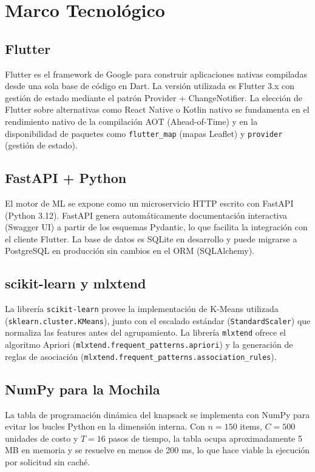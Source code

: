 \documentclass[12pt,letterpaper]{report}
\begin{document}
\section{Marco Tecnológico}

\subsection{Flutter}

Flutter es el framework de Google para construir aplicaciones nativas compiladas desde una
sola base de código en Dart. La versión utilizada es Flutter 3.x con gestión de estado
mediante el patrón Provider + ChangeNotifier. La elección de Flutter sobre alternativas
como React Native o Kotlin nativo se fundamenta en el rendimiento nativo de la compilación
AOT (Ahead-of-Time) y en la disponibilidad de paquetes como \texttt{flutter\_map}
(mapas Leaflet) y \texttt{provider} (gestión de estado).

\subsection{FastAPI + Python}

El motor de ML se expone como un microservicio HTTP escrito con FastAPI (Python 3.12).
FastAPI genera automáticamente documentación interactiva (Swagger UI) a partir de los
esquemas Pydantic, lo que facilita la integración con el cliente Flutter. La base de datos
es SQLite en desarrollo y puede migrarse a PostgreSQL en producción sin cambios en el ORM
(SQLAlchemy).

\subsection{scikit-learn y mlxtend}

La librería \texttt{scikit-learn} provee la implementación de K-Means utilizada
(\texttt{sklearn.cluster.KMeans}), junto con el escalado estándar
(\texttt{StandardScaler}) que normaliza las features antes del agrupamiento.
La librería \texttt{mlxtend} ofrece el algoritmo Apriori
(\texttt{mlxtend.frequent\_patterns.apriori}) y la generación de reglas de asociación
(\texttt{mlxtend.frequent\_patterns.association\_rules}).

\subsection{NumPy para la Mochila}

La tabla de programación dinámica del knapsack se implementa con NumPy para evitar los bucles
Python en la dimensión interna. Con $n=150$ items, $C=500$ unidades de costo y $T=16$ pasos de
tiempo, la tabla ocupa aproximadamente 5 MB en memoria y se resuelve en menos de 200 ms, lo que
hace viable la ejecución por solicitud sin caché.
\end{document}
